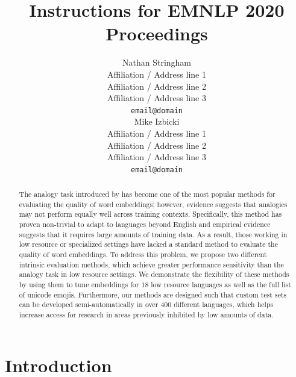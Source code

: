 \documentclass[11pt,a4paper]{article}
\title{Instructions for EMNLP 2020 Proceedings}
\author{Nathan Stringham\\
  Affiliation / Address line 1 \\
  Affiliation / Address line 2 \\
  Affiliation / Address line 3 \\
  \texttt{email@domain} \\\And
  Mike Izbicki \\
  Affiliation / Address line 1 \\
  Affiliation / Address line 2 \\
  Affiliation / Address line 3 \\
  \texttt{email@domain} \\}
\date{}
\begin{document}
\maketitle
\begin{abstract}

The analogy task introduced by \cite{mikolov2013efficient} has become one of the most popular  methods for evaluating the quality of word embeddings;
 however, evidence suggests that analogies may not perform equally well across training contexts.
 Specifically, this method has proven non-trivial to adapt to languages beyond English and empirical evidence suggests that it requires large amounts of training data.
 As a result, those working in low resource or specialized settings have lacked a standard method to evaluate the quality of word embeddings.
 To address this problem, we propose two different intrinsic evaluation methods, which achieve greater performance sensitivity than the analogy task in low resource settings.
  We demonstrate the flexibility of these methods by using them to tune embeddings for $18$ low resource languages as well as the full list of unicode emojis.
   Furthermore, our methods are designed such that custom test sets can be developed semi-automatically in over $400$ different languages, which helps increase access for research in areas previously inhibited by low amounts of data.
\end{abstract}


\section{Introduction}
\label{sec:intro}

%
%
\end{document}
